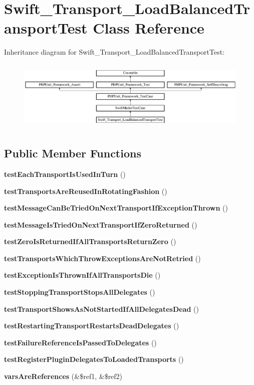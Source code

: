 \section{Swift\+\_\+\+Transport\+\_\+\+Load\+Balanced\+Transport\+Test Class Reference}
\label{class_swift___transport___load_balanced_transport_test}
Inheritance diagram for Swift\+\_\+\+Transport\+\_\+\+Load\+Balanced\+Transport\+Test\+:\begin{figure}[H]
\begin{center}
\leavevmode
\includegraphics[height=3.418803cm]{class_swift___transport___load_balanced_transport_test}
\end{center}
\end{figure}
\subsection*{Public Member Functions}
\begin{DoxyCompactItemize}
\item 
{\bf test\+Each\+Transport\+Is\+Used\+In\+Turn} ()
\item 
{\bf test\+Transports\+Are\+Reused\+In\+Rotating\+Fashion} ()
\item 
{\bf test\+Message\+Can\+Be\+Tried\+On\+Next\+Transport\+If\+Exception\+Thrown} ()
\item 
{\bf test\+Message\+Is\+Tried\+On\+Next\+Transport\+If\+Zero\+Returned} ()
\item 
{\bf test\+Zero\+Is\+Returned\+If\+All\+Transports\+Return\+Zero} ()
\item 
{\bf test\+Transports\+Which\+Throw\+Exceptions\+Are\+Not\+Retried} ()
\item 
{\bf test\+Exception\+Is\+Thrown\+If\+All\+Transports\+Die} ()
\item 
{\bf test\+Stopping\+Transport\+Stops\+All\+Delegates} ()
\item 
{\bf test\+Transport\+Shows\+As\+Not\+Started\+If\+All\+Delegates\+Dead} ()
\item 
{\bf test\+Restarting\+Transport\+Restarts\+Dead\+Delegates} ()
\item 
{\bf test\+Failure\+Reference\+Is\+Passed\+To\+Delegates} ()
\item 
{\bf test\+Register\+Plugin\+Delegates\+To\+Loaded\+Transports} ()
\item 
{\bf vars\+Are\+References} (\&\$ref1, \&\$ref2)
\end{DoxyCompactItemize}
